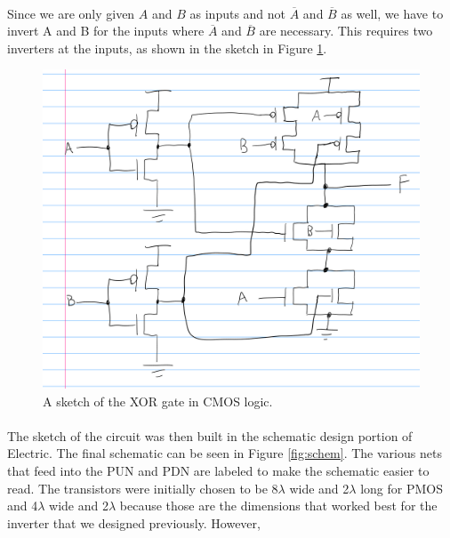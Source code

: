 \documentclass{article}
\begin{document}
  \paragraph{}
  Since we are only given $A$ and $B$ as inputs and not $\overline{A}$ and $\overline{B}$ as well, we have to invert A and B for the inputs where $\overline{A}$ and $\overline{B}$ are necessary. This requires two inverters at the inputs, as shown in the sketch in Figure \ref{fig:sketch2}.


  \begin{figure}[H]
    \centering
    \includegraphics[width=0.7\linewidth, frame]{screenshots/schematic-sketch-2.png}
    \caption{A sketch of the XOR gate in CMOS logic.}
    \label{fig:sketch2}
  \end{figure}

  \paragraph{}
  The sketch of the circuit was then built in the schematic design portion of Electric. The final schematic can be seen in Figure \ref{fig:schem}. The various nets that feed into the PUN and PDN are labeled to make the schematic easier to read. The transistors were initially chosen to be 8$\lambda$ wide and 2$\lambda$ long for PMOS and 4$\lambda$ wide and 2$\lambda$ because those are the dimensions that worked best for the inverter that we designed previously. However, 
\end{document}
